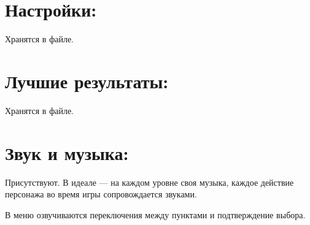 \documentclass[12pt,a4paper]{article}
\begin{document}
\section{Настройки:}
Хранятся в файле.
\section{Лучшие результаты:}
Хранятся в файле.
\section{Звук и музыка:}
Присутствуют. В идеале --- на каждом уровне своя музыка, каждое действие персонажа во время игры сопровождается звуками.

В меню озвучиваются переключения между пунктами и подтверждение выбора.
\end{document}
